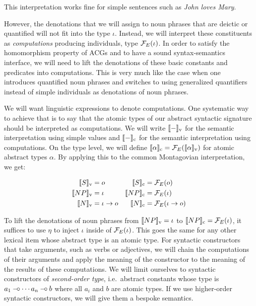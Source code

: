 This interpretation works fine for simple sentences such as \emph{John
  loves Mary}.

However, the denotations that we will assign to noun phrases that are
deictic or quantified will not fit into the type $\iota$. Instead, we
will interpret these constituents as \emph{computations} producing
individuals, type $\mathcal{F}_E(\iota)$. In order to satisfy the homomorphism
property of ACGs and to have a sound syntax-semantics interface, we will
need to lift the denotations of these basic constants and predicates into
computations. This is very much like the case when one introduces
quantified noun phrases and switches to using generalized quantifiers
instead of simple individuals as denotations of noun phrases.

We will want linguistic expressions to denote computations. One systematic
way to achieve that is to say that the atomic types of our abstract
syntactic signature should be interpreted as computations. We will write
$\llbracket - \rrbracket_{\mathrm{v}}$ for the semantic interpretation using simple values and
$\llbracket - \rrbracket_{\mathrm{c}}$ for the semantic interpretation using computations. On
the type level, we will define
$\llbracket \alpha \rrbracket_{\mathrm{c}} = \mathcal{F}_E(\llbracket \alpha \rrbracket_{\mathrm{v}})$ for atomic abstract
types $\alpha$. By applying this to the common Montagovian interpretation,
we get:

\begin{align*}
  \llbracket S \rrbracket_{\mathrm{v}} &= o & \llbracket S \rrbracket_{\mathrm{c}} &= \mathcal{F}_E(o) \\
  \llbracket NP \rrbracket_{\mathrm{v}} &= \iota & \llbracket NP \rrbracket_{\mathrm{c}} &= \mathcal{F}_E(\iota) \\
  \llbracket N \rrbracket_{\mathrm{v}} &= \iota \to o & \llbracket N \rrbracket_{\mathrm{c}} &= \mathcal{F}_E(\iota \to o)
\end{align*}

To lift the denotations of noun phrases from $\llbracket NP \rrbracket_{\mathrm{v}} = \iota$ to
$\llbracket NP \rrbracket_{\mathrm{c}} = \mathcal{F}_E(\iota)$, it suffices to use $\eta$ to inject
$\iota$ inside of $\mathcal{F}_E(\iota)$. This goes the same for any other lexical
item whose abstract type is an atomic type. For syntactic constructors that
take arguments, such as verbs or adjectives, we will chain the computations
of their arguments and apply the meaning of the constructor to the meaning
of the results of these computations. We will limit ourselves to syntactic
constructors of \emph{second-order type}, i.e.\ abstract constants whose
type is $a_1 \mathbin{{-}\mkern-3.5mu{\circ}} \cdots a_n \mathbin{{-}\mkern-3.5mu{\circ}} b$ where all $a_i$ and $b$ are atomic
types. If we use higher-order syntactic constructors, we will give them a
bespoke semantics.

